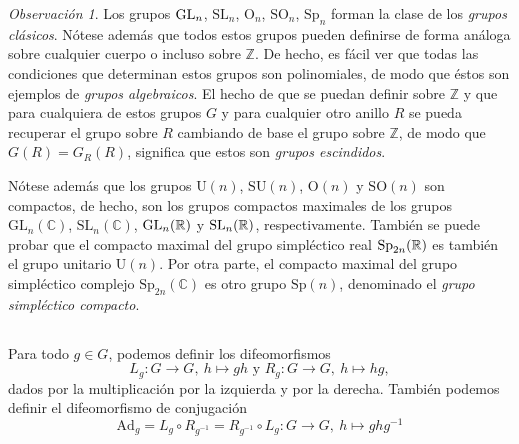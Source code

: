 \documentclass[11pt,a4paper]{amsbook}
\theoremstyle{remark} \newtheorem{rmk}[subsection]{Observación}
\theoremstyle{definition} \newtheorem{defn}[subsection]{Definición}
\theoremstyle{definition} \newtheorem{ex}[subsection]{Ejemplo}
\theoremstyle{definition} \newtheorem{ej}[subsection]{Ejercicio}
\begin{document}
\begin{rmk}
        Los grupos $\operatorname{GL}_n$, $\mathrm{SL}_n$, $\mathrm{O}_n$, $\mathrm{SO}_n$, $\mathrm{Sp}_n$ forman la clase de los \emph{grupos clásicos}. Nótese además que todos estos grupos pueden definirse de forma análoga sobre cualquier cuerpo o incluso sobre $\mathbb{Z}$. De hecho, es fácil ver que todas las condiciones que determinan estos grupos son polinomiales, de modo que éstos son ejemplos de \emph{grupos algebraicos}. El hecho de que se puedan definir sobre $\mathbb{Z}$ y que para cualquiera de estos grupos $G$ y para cualquier otro anillo $R$ se pueda recuperar el grupo sobre $R$ cambiando de base el grupo sobre $\mathbb{Z}$, de modo que $G(R) = G_{R}(R)$, significa que estos son \emph{grupos escindidos}.

        Nótese además que los grupos $\mathrm{U}(n)$, $\mathrm{SU}(n)$, $\mathrm{O}(n)$ y $\mathrm{SO}(n)$ son compactos, de hecho, son los grupos compactos maximales de los grupos $\mathrm{GL}_n(\mathbb{C})$, $\mathrm{SL}_n(\mathbb{C})$, $\mathrm{GL}_n(\mathbb R)$ y $\mathrm{SL}_n(\mathbb R)$, respectivamente. También se puede probar que el compacto maximal del grupo simpléctico real $\mathrm{Sp}_{2n}(\mathbb R)$ es también el grupo unitario $\mathrm{U}(n)$. Por otra parte, el compacto maximal del grupo simpléctico complejo $\mathrm{Sp}_{2n}(\mathbb{C})$ es otro grupo $\mathrm{Sp}(n)$, denominado el \emph{grupo simpléctico compacto}.
\end{rmk}

\subsection{} Para todo $g\in G$, podemos definir los difeomorfismos
\begin{equation*}
L_g: G\rightarrow G,\ h \mapsto gh \text{ y } R_g:G\rightarrow G,\ h \mapsto hg,
\end{equation*}
dados por la multiplicación por la izquierda y por la derecha. También podemos definir el difeomorfismo de conjugación
\begin{equation*}
\mathrm{Ad}_g = L_g \circ R_{g^{-1}} = R_{g^{-1}} \circ L_g: G\rightarrow G,\ h\mapsto ghg^{-1}
\end{equation*}
\end{document}
